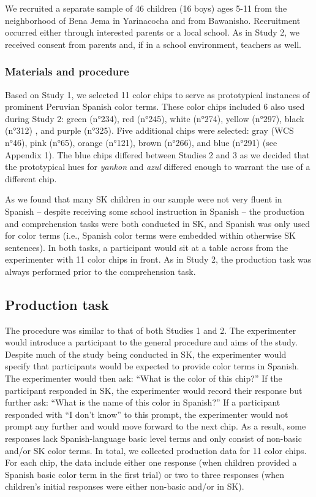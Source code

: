 \documentclass[
  ,apa7,floatsintext]{apa6}
\begin{document}
We recruited a separate sample of 46 children (16 boys) ages 5-11 from the neighborhood of Bena Jema in Yarinacocha and from Bawanisho. Recruitment occurred either through interested parents or a local school. As in Study 2, we received consent from parents and, if in a school environment, teachers as well.

\hypertarget{materials-and-procedure-2}{%
\subsubsection{Materials and procedure}\label{materials-and-procedure-2}}

Based on Study 1, we selected 11 color chips to serve as prototypical instances of prominent Peruvian Spanish color terms. These color chips included 6 also used during Study 2: green (n°234), red (n°245), white (n°274), yellow (n°297), black (n°312) , and purple (n°325). Five additional chips were selected: gray (WCS n°46), pink (n°65), orange (n°121), brown (n°266), and blue (n°291) (see Appendix 1). The blue chips differed between Studies 2 and 3 as we decided that the prototypical hues for \emph{yankon} and \emph{azul} differed enough to warrant the use of a different chip.

As we found that many SK children in our sample were not very fluent in Spanish -- despite receiving some school instruction in Spanish -- the production and comprehension tasks were both conducted in SK, and Spanish was only used for color terms (i.e., Spanish color terms were embedded within otherwise SK sentences). In both tasks, a participant would sit at a table across from the experimenter with 11 color chips in front. As in Study 2, the production task was always performed prior to the comprehension task.

\hypertarget{production-task-1}{%
\subsection{Production task}\label{production-task-1}}

The procedure was similar to that of both Studies 1 and 2. The experimenter would introduce a participant to the general procedure and aims of the study. Despite much of the study being conducted in SK, the experimenter would specify that participants would be expected to provide color terms in Spanish. The experimenter would then ask: ``What is the color of this chip?'' If the participant responded in SK, the experimenter would record their response but further ask: ``What is the name of this color in Spanish?'' If a participant responded with ``I don't know'' to this prompt, the experimenter would not prompt any further and would move forward to the next chip. As a result, some responses lack Spanish-language basic level terms and only consist of non-basic and/or SK color terms. In total, we collected production data for 11 color chips. For each chip, the data include either one response (when children provided a Spanish basic color term in the first trial) or two to three responses (when children's initial responses were either non-basic and/or in SK).
\end{document}
